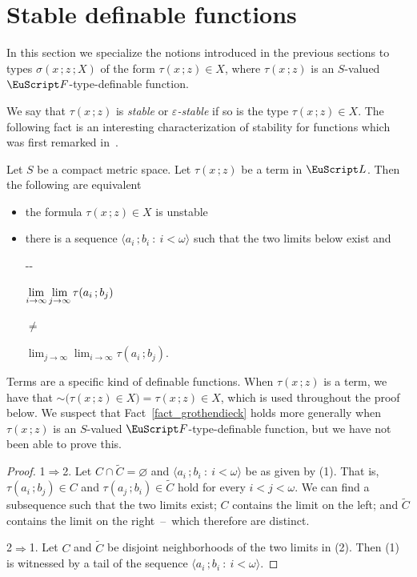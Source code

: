 \section{Stable definable functions}
\def\medrel#1{\parbox{5ex}{\hfil $#1$}}
\def\ceq#1#2#3{\parbox[t]{28ex}{$\displaystyle #1$}\medrel{#2}{$\displaystyle #3$}}

In this section we specialize the notions introduced in the previous sections to types $\sigma(x\,;z\,;X)$ of the form $\tau(x\,;z)\in X$, where $\tau(x\,;z)$ is an $S$-valued ${\EuScript F}$-type-definable function.

We say that $\tau(x\,;z)$ is \emph{stable\/} or \emph{$\varepsilon$-stable\/} if so is the type $\tau(x\,;z)\in X$.
The following fact is an interesting characterization of stability for functions which was first remarked in~\cite{B}.

\begin{fact}\label{fact_grothendieck}
  Let $S$ be a compact metric space.
  Let $\tau(x\,;z)$ be a term in ${\EuScript L}$.
  Then the following are equivalent
  \begin{itemize}
    \item [1.] the formula $\tau(x\,;z)\in X$ is unstable
    \item [2.] there is a sequence $\langle a_i\,;b_i\ :\ i<\omega\rangle$ such that the two limits below exist and\smallskip
    
    \noindent\kern-\kern-
    \ceq{\hfill \lim_{i\to\infty}\lim_{j\to\infty}\tau(a_i\,;b_j)}{\neq}{\lim_{j\to\infty}\lim_{i\to\infty}\tau(a_i\,;b_j).}
  \end{itemize}
\end{fact}  
  Terms are a specific kind of definable functions.
  When $\tau(x\,;z)$ is a term, we have that ${\sim}\big(\tau(x\,;z)\in X\big)=\tau(x\,;z)\in X$, which is used throughout the proof below.
  We suspect that Fact~\ref{fact_grothendieck} holds more generally when $\tau(x\,;z)$ is an $S$-valued ${\EuScript F}$-type-definable function, but we have not been able to prove this.

\begin{proof}
  1$\Rightarrow$2.
  Let $C\cap\tilde C=\varnothing$ and $\langle a_i\,;b_i\ :\ i<\omega\rangle$ be as given by (1).
  That is, $\tau(a_i\,;b_j)\in C$ and $\tau(a_j\,;b_i)\in \tilde C$ hold for every $i<j<\omega$.
  We can find a subsequence such that the two limits exist; $C$ contains the limit on the left; and $\tilde C$ contains the limit on the right~--~which therefore are distinct.%

  2$\Rightarrow$1. Let $C$ and $\tilde C$ be disjoint neighborhoods of the two limits in (2).
  Then (1) is witnessed by a tail of the sequence $\langle a_i\,;b_i\ :\ i<\omega\rangle$.
\end{proof}


